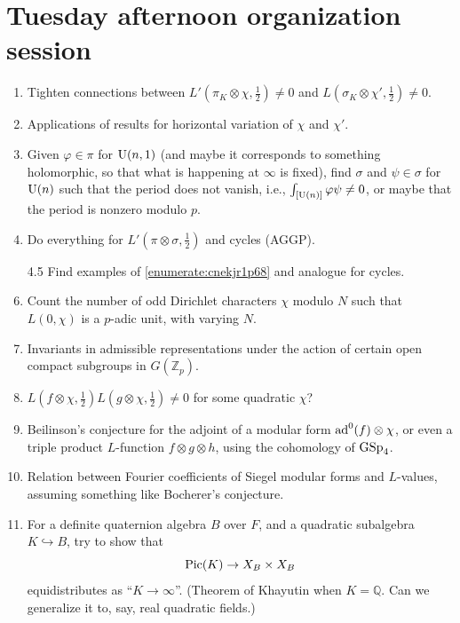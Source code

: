 \documentclass[reqno]{amsart} 
\begin{document}
\section{Tuesday afternoon organization session}\label{sec:cnfhlpu0zj}

\begin{enumerate}
\item\label{enumerate:cnekjr1oym} Tighten connections between $L'(\pi_K \otimes \chi, \tfrac{1}{2} ) \neq 0$ and $L(\sigma_K \otimes \chi ', \tfrac{1}{2} ) \neq 0$.
\item\label{enumerate:cnekjr1pna} Applications of results for horizontal variation of $\chi$ and $\chi '$.
\item\label{enumerate:cnekjr1p68} Given $\varphi \in \pi $ for $\operatorname{U}(n, 1)$ (and maybe it corresponds to something holomorphic, so that what is happening at $\infty$ is fixed), find $\sigma$ and $\psi \in \sigma$ for $\operatorname{U}(n)$ such that the period does not vanish, i.e., $\int_{[\operatorname{U}(n)]} \varphi \psi \neq 0$, or maybe that the period is nonzero modulo $p$.
\item\label{enumerate:cnekjr1qyd} Do everything for $L '(\pi \otimes \sigma, \tfrac{1}{2})$ and cycles (AGGP).
\item[4.5]\label{enumerate:cnekjr1s9k} Find examples of \eqref{enumerate:cnekjr1p68} and analogue for cycles.
\item\label{enumerate:cnekjr5mnb} Count the number of odd Dirichlet characters $\chi$ modulo $N$ such that $L(0, \chi )$ is a $p$-adic unit, with varying $N$.
\item\label{enumerate:cnekjr47jp} Invariants in admissible representations under the action of certain open compact subgroups in $G(\mathbb{Z}_p)$.
\item\label{enumerate:cnekjr46s8} $L(f \otimes \chi, \tfrac{1}{2} ) L(g \otimes \chi, \tfrac{1}{2} ) \neq 0$ for some quadratic $\chi$?
\item\label{enumerate:cnekjr5udx} Beilinson's conjecture for the adjoint of a modular form $\operatorname{ad}^0(f) \otimes \chi$, or even a triple product $L$-function $f \otimes g \otimes h$, using the cohomology of $\operatorname{GSp}_4$.
\item\label{enumerate:cnekjr9kus} Relation between Fourier coefficients of Siegel modular forms and $L$-values, assuming something like Bocherer's conjecture.
\item\label{enumerate:cnekjr9lm8} For a definite quaternion algebra $B$ over $F$, and a quadratic subalgebra $K \hookrightarrow B$, try to show that
  \begin{equation*}
    \operatorname{Pic}(K) \rightarrow X_B \times X_B 
  \end{equation*}
  equidistributes as ``$K \rightarrow \infty$''.  (Theorem of Khayutin when $K = \mathbb{Q}$.  Can we generalize it to, say, real quadratic fields.)
\end{enumerate}
\end{document}
